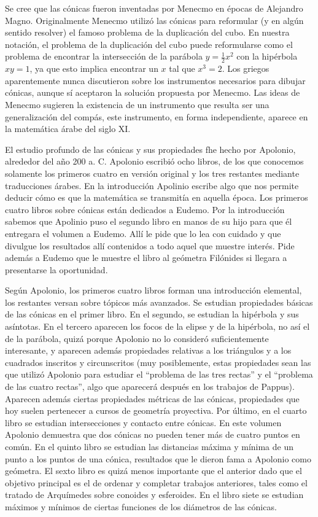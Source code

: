 Se cree que las cónicas fueron inventadas por Menecmo en épocas de Alejandro
Magno. Originalmente Menecmo utilizó las cónicas para reformular (y en algún
sentido resolver) el famoso problema de la duplicación del cubo. En nuestra
notación, el problema de la duplicación del cubo puede reformularse como el
problema de encontrar la intersección de la parábola $y=\frac12x^2$ con la
hipérbola $xy=1$, ya que esto implica encontrar un $x$ tal que $x^3=2$. Los
griegos aparentemente nunca discutieron sobre los instrumentos necesarios
para dibujar cónicas, aunque sí aceptaron la solución propuesta por Menecmo.
Las ideas de Menecmo sugieren la existencia de un instrumento que resulta ser
una generalización del compás, este instrumento, en forma independiente,
aparece en la matemática árabe del siglo XI. 

El estudio profundo de las cónicas y sus propiedades fhe hecho por Apolonio,
alrededor del año 200 a. C.  Apolonio escribió ocho libros, de los que
conocemos solamente los primeros cuatro en versión original y los tres
restantes mediante traducciones árabes. En la introducción Apolinio escribe
algo que nos permite deducir cómo es que la matemática se transmitía en aquella
época. Los primeros cuatro libros sobre cónicas están dedicados a Eudemo.  Por
la introducción sabemos que Apolinio puso el segundo libro en manos de su hijo
para que él entregara el volumen a Eudemo. Allí le pide que lo lea con cuidado
y que divulgue los resultados allí contenidos a todo aquel que muestre interés.
Pide además a Eudemo que le muestre el libro al geómetra Filónides si llegara a
presentarse la oportunidad. 


Según Apolonio, los primeros cuatro libros forman una introducción elemental,
los restantes versan sobre tópicos más avanzados.  Se estudian propiedades
básicas de las cónicas en el primer libro. En el segundo, se estudian la
hipérbola y sus asíntotas. En el tercero aparecen los focos de la elipse y de
la hipérbola, no así el de la parábola, quizá porque Apolonio no lo consideró
suficientemente interesante, y aparecen además propiedades relativas a los
triángulos y a los cuadrados inscritos y circunscritos (muy posiblemente, estas
propiedades sean las que utilizó Apolonio para estudiar el ``problema de las
tres rectas'' y el ``problema de las cuatro rectas'', algo que aparecerá
después en los trabajos de Pappus). Aparecen además ciertas propiedades métricas
de las cónicas, propiedades que hoy suelen pertenecer a cursos de geometría
proyectiva. Por último, en el cuarto libro se estudian intersecciones y contacto
entre cónicas. En este volumen Apolonio demuestra que dos cónicas no pueden
tener más de cuatro puntos en común. En el quinto libro se estudian las
distancias máxima y mínima de un punto a los puntos de una cónica, resultados
que le dieron fama a Apolonio como geómetra. El sexto libro es quizá menos
importante que el anterior dado que el objetivo principal es el de ordenar y
completar trabajos anteriores, tales como el tratado de Arquímedes sobre
conoides y esferoides. En el libro siete se estudian máximos y mínimos de
ciertas funciones de los diámetros de las cónicas. 

